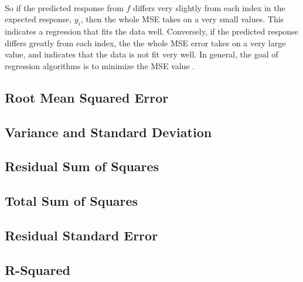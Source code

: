 \documentclass[12pt,letterpaper]{article}
\begin{document}
\paragraph*{}So if the predicted response from $\hat{f}$ differs very slightly from each index in the expected response, $y_i$, then the whole MSE takes on a very small values. This indicates a regression that fits the data well. Conversely, if the predicted response differs greatly from each index, the the whole MSE error takes on a very large value, and indicates that the data is not fit very well. In general, the goal of regression algorithms is to minimize the MSE value \cite{Petrik}.


\subsection{Root Mean Squared Error}



\subsection{Variance and Standard Deviation}



\subsection{Residual Sum of Squares}


\subsection{Total Sum of Squares}


\subsection{Residual Standard Error}



\subsection{R-Squared}
\end{document}
